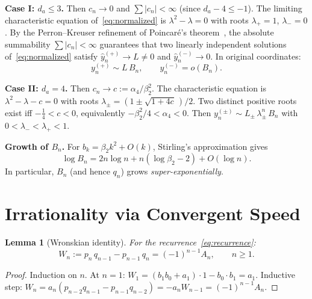 \documentclass[11pt,a4paper]{article}
\newtheorem{lemma}[theorem]{Lemma}
\theoremstyle{definition}
\theoremstyle{remark}
\newcommand{\abs}[1]{\lvert #1 \rvert}
\begin{document}
\medskip
\noindent\textbf{Case I: $d_a \leq 3$.}
Then $c_n \to 0$ and $\sum \abs{c_n} < \infty$ (since $d_a - 4 \leq -1$).
The limiting characteristic equation of~\eqref{eq:normalized} is
$\lambda^2 - \lambda = 0$ with roots $\lambda_+ = 1$, $\lambda_- = 0$.
By the Perron--Kreuser refinement of Poincar\'e's
theorem~\cite{perron1929,pituk2002}, the absolute summability
$\sum\abs{c_n} < \infty$ guarantees that two linearly independent
solutions of~\eqref{eq:normalized} satisfy
$\hat{y}_n^{(+)} \to L \neq 0$ and $\hat{y}_n^{(-)} \to 0$.
In original coordinates:
\begin{equation}\label{eq:growth}
  y_n^{(+)} \sim L\, B_n, \qquad y_n^{(-)} = o(B_n).
\end{equation}

\noindent\textbf{Case II: $d_a = 4$.}
Then $c_n \to c := \alpha_4/\beta_2^2$.  The characteristic equation is
$\lambda^2 - \lambda - c = 0$ with roots
$\lambda_{\pm} = (1 \pm \sqrt{1+4c}\,)/2$.
Two distinct positive roots exist iff $-\tfrac{1}{4} < c < 0$,
equivalently $-\beta_2^2/4 < \alpha_4 < 0$.
Then $y_n^{(\pm)} \sim L_{\pm}\, \lambda_{\pm}^n\, B_n$
with $0 < \lambda_- < \lambda_+ < 1$.

\medskip
\noindent\textbf{Growth of $B_n$.}
For $b_k = \beta_2 k^2 + O(k)$, Stirling's approximation gives
\begin{equation}\label{eq:Bn_growth}
  \log B_n = 2n\log n + n(\log\beta_2 - 2) + O(\log n).
\end{equation}
In particular, $B_n$ (and hence $q_n$) grows \emph{super-exponentially}.


\section{Irrationality via Convergent Speed}\label{sec:irrationality}

\begin{lemma}[Wronskian identity]\label{lem:wronskian}
For the recurrence~\eqref{eq:recurrence}:
\[
  W_n := p_n\, q_{n-1} - p_{n-1}\, q_n = (-1)^{n-1} A_n,
  \qquad n \geq 1.
\]
\end{lemma}

\begin{proof}
Induction on $n$.  At $n=1$: $W_1 = (b_1 b_0 + a_1)\cdot 1 - b_0 \cdot b_1 = a_1$.
Inductive step:
$W_n = a_n(p_{n-2} q_{n-1} - p_{n-1} q_{n-2}) = -a_n W_{n-1}
     = (-1)^{n-1} A_n$.
\end{proof}
\end{document}
